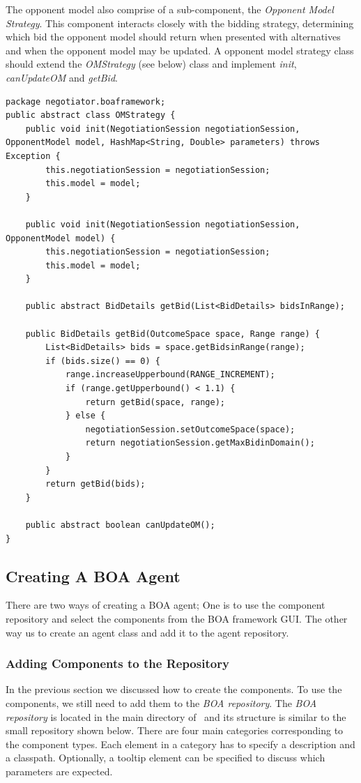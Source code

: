 \documentclass[]{article}
\begin{document}
The opponent model also comprise of a sub-component, the \textit{Opponent Model Strategy}. This component interacts closely with the bidding strategy, determining which bid the opponent model should return when presented with alternatives and when the opponent model may be updated. A opponent model strategy class should extend the \textit{OMStrategy} (see below) class and implement \textit{init}, \textit{canUpdateOM} and \textit{getBid}.

\begin{lstlisting}
package negotiator.boaframework;
public abstract class OMStrategy {
	public void init(NegotiationSession negotiationSession, OpponentModel model, HashMap<String, Double> parameters) throws Exception {
		this.negotiationSession = negotiationSession;
		this.model = model;
	}
	
	public void init(NegotiationSession negotiationSession, OpponentModel model) {
		this.negotiationSession = negotiationSession;
		this.model = model;
	}
	
	public abstract BidDetails getBid(List<BidDetails> bidsInRange);
	
	public BidDetails getBid(OutcomeSpace space, Range range) {
		List<BidDetails> bids = space.getBidsinRange(range);
		if (bids.size() == 0) {
			range.increaseUpperbound(RANGE_INCREMENT);
			if (range.getUpperbound() < 1.1) {
				return getBid(space, range);
			} else {
				negotiationSession.setOutcomeSpace(space);
				return negotiationSession.getMaxBidinDomain();
			}
		}
		return getBid(bids);
	}
	
	public abstract boolean canUpdateOM();
}
\end{lstlisting}

\subsection{Creating A BOA Agent}
There are two ways of creating a BOA agent; One is to use the component repository and select the components from the BOA framework GUI.  The other way us to create an agent class and add it to the agent repository.

\subsubsection{Adding Components to the Repository}
In the previous section we discussed how to create the components. To use the components, we still need to add them to the \textit{BOA repository}. The \textit{BOA repository} is located in the main directory of \Genius ~and its structure is similar to the small repository shown below. There are four main categories corresponding to the component types. Each element in a category has to specify a description and a classpath. Optionally, a tooltip element can be specified to discuss which parameters are expected.
\end{document}
